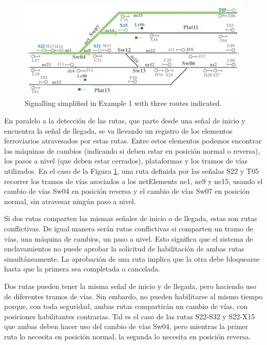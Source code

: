     \begin{figure}[H]
    	\centering
    	\includegraphics[width=1\textwidth]{Figuras/Figure11.pdf}
    	\centering\caption{Signalling simplified in Example 1 with three routes indicated.}
    	\label{fig:Routes}
    \end{figure}
        
    En paralelo a la detección de las rutas, que parte desde una señal de inicio y encuentra la señal de llegada, se va llevando un registro de los elementos ferroviarios atravesados por estas rutas. Entre estos elementos podemos encontrar las máquinas de cambios (indicando si deben estar en posición normal o reversa), los pasos a nivel (que deben estar cerrados), plataformas y los tramos de vías utilizados. En el caso de la Figura \ref{fig:Routes}, una ruta definida por las señalas S22 y T05 recorrer los tramos de vías asociados a los netElements ne1, ne9 y ne15, usando el cambio de vías Sw04 en posición reversa y el cambio de vías Sw07 en posición normal, sin atravesar ningún paso a nivel.
    
    Si dos rutas comparten las mismas señales de inicio o de llegada, estas son rutas conflictivas. De igual manera serán rutas conflictivas si comparten un tramo de vías, una máquina de cambios, un paso a nivel. Esto significa que el sistema de enclavamientos no puede aprobar la solicitud de habilitación de ambas rutas simultáneamente. La aprobación de una ruta implica que la otra debe bloquearse hasta que la primera sea completada o cancelada. 
    
    Dos rutas pueden tener la misma señal de inicio y de llegada, pero haciendo uso de diferentes tramos de vías. Sin embardo, no pueden habilitarse al mismo tiempo porque, con toda seguridad, ambas rutas compartirán un cambio de vías, con posiciones habilitantes contrarias. Tal es el caso de las rutas S22-S32 y S22-X15 que ambas deben hacer uso del cambio de vías Sw04, pero mientras la primer ruta lo necesita en posición normal, la segunda lo necesita en posición reversa.
    
